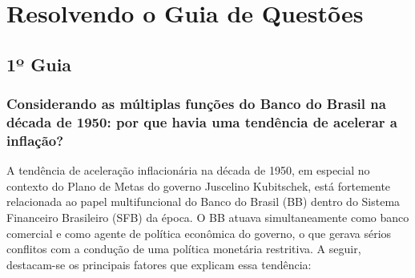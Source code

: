 \documentclass[a4paper,12pt]{article}[abntex2]
\begin{document}
\newpage
\section{\textbf{Resolvendo o Guia de Questões}}
\subsection{\textbf{1º Guia}}
\subsubsection{\textbf{Considerando as múltiplas funções do Banco do Brasil na década de 1950: por que havia uma tendência de acelerar a inflação?}}

A tendência de aceleração inflacionária na década de 1950, em especial no contexto do Plano de Metas do governo Juscelino Kubitschek, está fortemente relacionada ao papel multifuncional do Banco do Brasil (BB) dentro do Sistema Financeiro Brasileiro (SFB) da época. O BB atuava simultaneamente como banco comercial e como agente de política econômica do governo, o que gerava sérios conflitos com a condução de uma política monetária restritiva. A seguir, destacam-se os principais fatores que explicam essa tendência:
\end{document}
